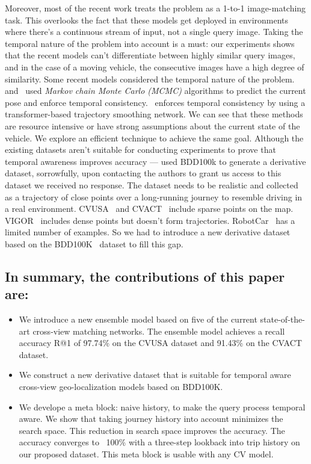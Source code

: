 \documentclass[10pt,letterpaper]{article}
\begin{document}
Moreover, most of the recent work treats the problem as a 1-to-1 image-matching task. This overlooks the fact that these models get deployed in environments where there's a continuous stream of input, not a single query image. Taking the temporal nature of the problem into account is a must:  our experiments shows that the recent models can't differentiate between highly similar query images, and in the case of a moving vehicle, the consecutive images have a high degree of similarity. Some recent models considered the temporal nature of the problem.~\cite{bib7}  and~\cite{bib20,bib21,bib22} used \emph{Markov chain Monte Carlo (MCMC)} algorithms to predict the current pose and enforce temporal consistency.~\cite{bib24} enforces temporal consistency by using a transformer-based trajectory smoothing network. We can see that these methods are resource intensive or have strong assumptions about the current state of the vehicle. We explore an efficient technique to achieve the same goal.
Although the existing datasets aren't suitable for conducting experiments to prove that temporal awareness improves accuracy  — \cite{bib24} used BDD100k to generate a derivative dataset, sorrowfully, upon contacting the authors to grant us access to this dataset we received no response. The dataset needs to be realistic and collected as a trajectory of close points over a long-running journey to resemble driving in a real environment.  CVUSA~\cite{bib55} and CVACT~\cite{bib4} include sparse points on the map. VIGOR~\cite{bib5} includes dense points but doesn't form trajectories. RobotCar~\cite{bib6} has a limited number of examples. So we had to introduce a new derivative dataset based on the BDD100K~\cite{bib12} dataset to fill this gap.

\subsection*{In summary, the contributions of this paper are:}
\begin{itemize}
    \item We introduce a new ensemble model based on five of the current state-of-the-art  cross-view matching networks. The ensemble model achieves a recall accuracy R@1 of 97.74\% on the CVUSA dataset and 91.43\% on the CVACT dataset.
    \item We construct a new derivative dataset that is suitable for temporal aware cross-view geo-localization models based on BDD100K.
    \item We develope a meta block: naive history, to make the query process temporal aware. We show that taking journey history into account minimizes the search space. This reduction in search space improves the accuracy.  The accuracy converges to ~100\% with a three-step lookback into trip history on our proposed dataset. This meta block is usable with any CV model.
\end{itemize}
\end{document}
